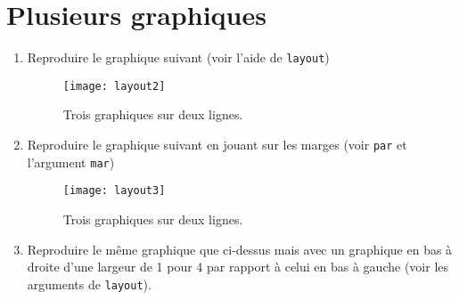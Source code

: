 \documentclass[a4paper,10pt,french]{article}
\newcommand{\fct}[1]{\texttt{#1}}
\newcommand{\code}[1]{\texttt{#1}}
\begin{document}
\section{Plusieurs graphiques}
\begin{enumerate}
\item Reproduire le graphique suivant (voir l'aide de \texttt{layout})
\begin{figure}[H]
\begin{center}
\texttt{[image: layout2]}
\caption{Trois graphiques sur deux lignes.\label{fig:layout3}}
\end{center}
\end{figure}
\item Reproduire le graphique suivant en jouant sur les marges (voir \texttt{par} et l'argument \texttt{mar})
\begin{figure}[H]
\begin{center}
\texttt{[image: layout3]}
\caption{Trois graphiques sur deux lignes.\label{fig:layout3}}
\end{center}
\end{figure}
\item Reproduire le m\^eme graphique que ci-dessus mais avec un graphique en bas \`a droite d'une largeur de 1 pour 4 par rapport \`a celui en bas \`a gauche (voir les arguments de \code{\fct{layout}}).
\end{enumerate}
\end{document}
